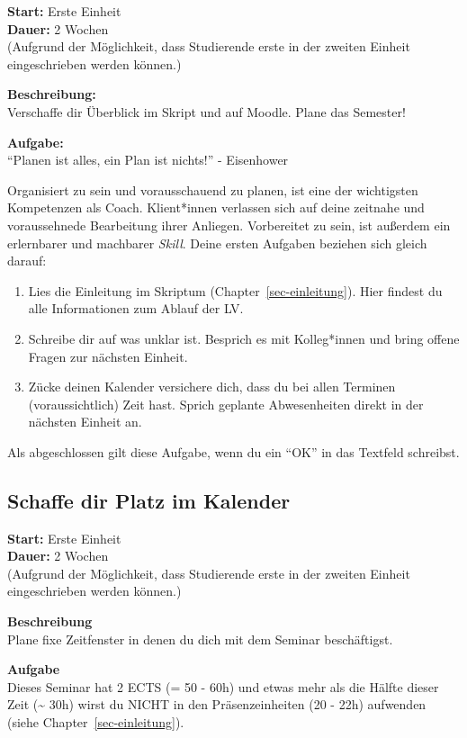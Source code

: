 \documentclass[
  letterpaper,
  DIV=11,
  numbers=noendperiod]{scrreprt}
\providecommand{\tightlist}{%
  \setlength{\itemsep}{0pt}\setlength{\parskip}{0pt}}
\begin{document}
\textbf{Start:} Erste Einheit\\
\textbf{Dauer:} 2 Wochen\\
(Aufgrund der Möglichkeit, dass Studierende erste in der zweiten Einheit
eingeschrieben werden können.)

\textbf{Beschreibung:}\\
Verschaffe dir Überblick im Skript und auf Moodle. Plane das Semester!

\textbf{Aufgabe:}\\
``Planen ist alles, ein Plan ist nichts!'' - Eisenhower

Organisiert zu sein und vorausschauend zu planen, ist eine der
wichtigsten Kompetenzen als Coach. Klient*innen verlassen sich auf deine
zeitnahe und voraussehnede Bearbeitung ihrer Anliegen. Vorbereitet zu
sein, ist außerdem ein erlernbarer und machbarer \emph{Skill}. Deine
ersten Aufgaben beziehen sich gleich darauf:

\begin{enumerate}
\def\labelenumi{\arabic{enumi})}
\tightlist
\item
  Lies die Einleitung im Skriptum (Chapter~\ref{sec-einleitung}). Hier
  findest du alle Informationen zum Ablauf der LV.
\item
  Schreibe dir auf was unklar ist. Besprich es mit Kolleg*innen und
  bring offene Fragen zur nächsten Einheit.
\item
  Zücke deinen Kalender versichere dich, dass du bei allen Terminen
  (voraussichtlich) Zeit hast. Sprich geplante Abwesenheiten direkt in
  der nächsten Einheit an.
\end{enumerate}

Als abgeschlossen gilt diese Aufgabe, wenn du ein ``OK'' in das Textfeld
schreibst.

\subsection{Schaffe dir Platz im
Kalender}\label{schaffe-dir-platz-im-kalender}

\textbf{Start:} Erste Einheit\\
\textbf{Dauer:} 2 Wochen\\
(Aufgrund der Möglichkeit, dass Studierende erste in der zweiten Einheit
eingeschrieben werden können.)

\textbf{Beschreibung}\\
Plane fixe Zeitfenster in denen du dich mit dem Seminar beschäftigst.

\textbf{Aufgabe}\\
Dieses Seminar hat 2 ECTS (= 50 - 60h) und etwas mehr als die Hälfte
dieser Zeit (\textasciitilde{} 30h) wirst du NICHT in den
Präsenzeinheiten (20 - 22h) aufwenden (siehe
Chapter~\ref{sec-einleitung}).
\end{document}
